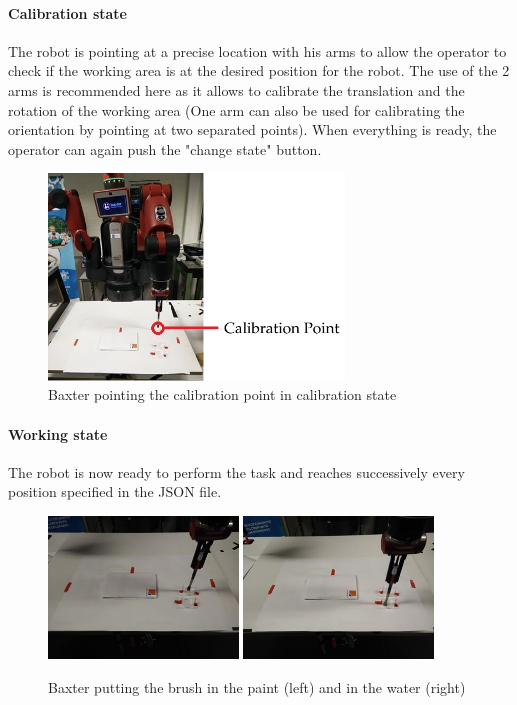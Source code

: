 \paragraph{Calibration state}The robot is pointing at a precise location with his arms to allow the operator to check if the working area is at the desired position for the robot. The use of the 2 arms is recommended here as it allows to calibrate the translation and the rotation of the working area (One arm can also be used for calibrating the orientation by pointing at two separated points). When everything is ready, the operator can again push the "change state" button.

\begin{figure}[!ht]
	\centering
	\includegraphics[width = 0.7\textwidth]{report/Images/Calibration.jpg}
    \caption{Baxter pointing the calibration point in calibration state}
    \label{fig:calibration}
\end{figure}

\paragraph{Working state}The robot is now ready to perform the task and reaches successively every position specified in the JSON file.

\begin{figure}[!ht]
	\centering
	\includegraphics[width = 0.45\textwidth]{report/Images/BaxterPaint.jpg}
	\includegraphics[width = 0.45\textwidth]{report/Images/BaxterWater.jpg}
    \caption{Baxter putting the brush in the paint (left) and in the water (right)}
    \label{fig:PaintWater}
\end{figure}

